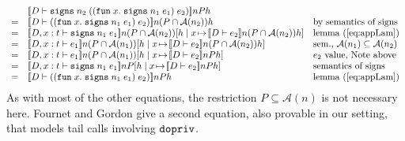 \documentclass[submission,copyright,creativecommons]{eptcs}
\newcommand{\signs}[2]{\SIGNS\;#1\;#2}
\newcommand{\A}{\mathcal{A}}
\newcommand{\ldb}{[\![}
\newcommand{\rdb}{]\!]}
\newcommand{\means}[1]{\ldb {#1}\rdb}
\newcommand{\intersect}{\cap}
\newcommand{\proves}{\vdash}
\newcommand{\ext}[3]{[#1\mid#2\!\mapsto\!#3]}
\newcommand{\ENABLE}{\mbox{\texttt{dopriv}}}
\newcommand{\SIGNS}{\mbox{\texttt{signs}}}
\newcommand{\LAM}[2]{{\mathtt{fun}\; #1.\; #2}}
\newcommand{\n}{n} \newcommand{\p}{p} \newcommand{\Ps}{\Pi} \newcommand{\h}{h}
\begin{document}
\[\begin{array}{clll}
  & \means{D\proves \signs{\n_2}{ ((\LAM{x}{ \signs{\n_1}{e_1}}) \; e_2) }}\n P \h \\
=  & \means{D\proves ((\LAM{x}{ \signs{\n_1}{e_1}}) \; e_2) }\n (P\intersect \A(\n_2)) \h 
      & \mbox{by semantics of signs} \\
=  & \means{D,x:t\proves \signs{\n_1}{e_1}}\n (P\intersect \A(\n_2)) 
                                         \ext{\h}{x}{ \means{D\proves e_2}\n (P\intersect \A(\n_2)) \h} 
      & \mbox{lemma (\ref{eq:appLam})}  \\
=  & \means{D,x:t\proves e_1}\n (P\intersect \A(\n_1)) 
                                          \ext{\h}{x}{ \means{D\proves e_2}\n (P\intersect \A(\n_2)) \h}
        & \mbox{sem., $\A(\n_1)\subseteq \A(\n_2)$} \\
=  & \means{D,x:t\proves e_1}\n (P\intersect \A(\n_1)) 
                                          \ext{\h}{x}{ \means{D\proves e_2}\n P \h}
         & \mbox{$e_2$ value, Note above} \\
=  & \means{D,x:t\proves \signs{n_1}{e_1}}\n P \ext{\h}{x}{ \means{D\proves e_2}\n P \h}
         & \mbox{semantics of signs} \\
=  & \means{D\proves ((\LAM{x}{ \signs{\n_1}{e_1}}) \; e_2)}\n P h
       & \mbox{lemma (\ref{eq:appLam})} 
\end{array}\]
As with most of the other equations, the restriction $P\subseteq \A(\n)$ is not necessary here.
Fournet and Gordon give a second equation, also provable in our setting, that models tail calls involving $\ENABLE$.
\end{document}
